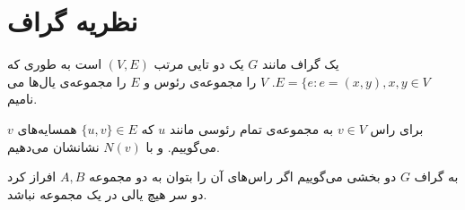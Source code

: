 \section{نظریه گراف}
\begin{definition}
یک گراف مانند
$G$
یک دو تایی مرتب
$(V, E)$
است به طوری که
$E = \{e: e = (x, y), x, y \in V$.
 $V$
را مجموعه‌ی رئوس و
$E$
را مجموعه‌ی یال‌ها می نامیم.

برای راس
$v\in V$
به مجمو‌عه‌ی تمام رئوسی مانند
  $u$ 
  که
  $\{u,v\}\in E$ 
  همسایه‌های 
  $v$
  می‌گوییم.
  و با
  $N(v)$
  نشانشان می‌دهیم.
  
به گراف
$G$
دو بخشی می‌گوییم اگر راس‌های آن را بتوان به دو مجموعه 
$A, B$
افراز کرد دو سر هیچ یالی در یک مجموعه نباشد.
\end{definition}

